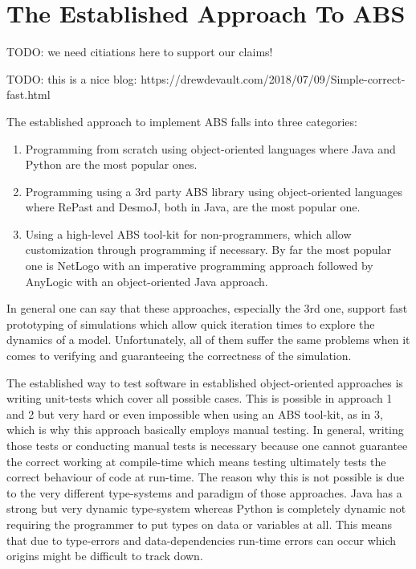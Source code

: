 \section{The Established Approach To ABS}
TODO: we need citiations here to support our claims!

TODO: this is a nice blog: https://drewdevault.com/2018/07/09/Simple-correct-fast.html

The established approach to implement ABS falls into three categories:
\begin{enumerate}
	\item Programming from scratch using object-oriented languages where Java and Python are the most popular ones.
	\item Programming using a 3rd party ABS library using object-oriented languages where RePast and DesmoJ, both in Java, are the most popular one.
	\item Using a high-level ABS tool-kit for non-programmers, which allow customization through programming if necessary. By far the most popular one is NetLogo with an imperative programming approach followed by AnyLogic with an object-oriented Java approach.
\end{enumerate}

In general one can say that these approaches, especially the 3rd one, support fast prototyping of simulations which allow quick iteration times to explore the dynamics of a model. Unfortunately, all of them suffer the same problems when it comes to verifying and guaranteeing the correctness of the simulation.

The established way to test software in established object-oriented approaches is writing unit-tests which cover all possible cases. This is possible in approach 1 and 2 but very hard or even impossible when using an ABS tool-kit, as in 3, which is why this approach basically employs manual testing. In general, writing those tests or conducting manual tests is necessary because one cannot guarantee the correct working at compile-time which means testing ultimately tests the correct behaviour of code at run-time. The reason why this is not possible is due to the very different type-systems and paradigm of those approaches. Java has a strong but very dynamic type-system whereas Python is completely dynamic not requiring the programmer to put types on data or variables at all. This means that due to type-errors and data-dependencies run-time errors can occur which origins might be difficult to track down.

